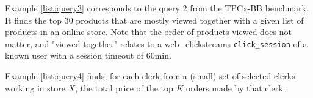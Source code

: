 \begin{appendices}
Example \ref{list:query3} corresponds to the query 2 from the TPCx-BB benchmark. It finds the top 30 products that are mostly viewed together with a given list of products in an online store. Note that the order of products viewed does not matter, and "viewed together" relates to a web\_clickstreams \texttt{click\_session} of a known user with a session timeout of 60min.



Example \ref{list:query4} finds, for each clerk from a (small) set of selected clerks working in store $X$, the total price of the top $K$ orders made by that clerk.



\end{appendices}